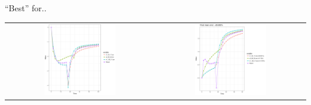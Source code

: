 \documentclass{beamer}
\begin{document}
\begin{frame}{``Best'' for..}
	\begin{table}
		\begin{tabular}{ cc }
			\includegraphics[width=0.5\textwidth]{multi_3_correction.png} &
			\includegraphics[width=0.5\textwidth]{multi_3_result.png} \\
		\end{tabular}
	\end{table}
\end{frame}
\end{document}
